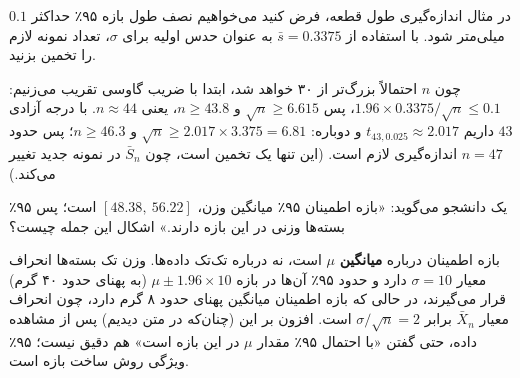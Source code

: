 \begin{exercise}
در مثال اندازه‌گیری طول قطعه، فرض کنید می‌خواهیم نصف طول بازه ۹۵٪ حداکثر $0.1$ میلی‌متر شود. با استفاده از $\bar s=0.3375$ به عنوان حدس اولیه برای $\sigma$، تعداد نمونه لازم را تخمین بزنید.
\end{exercise}
\begin{solution}
چون $n$ احتمالاً بزرگ‌تر از ۳۰ خواهد شد، ابتدا با ضریب گاوسی تقریب می‌زنیم: $1.96\times0.3375/\sqrt n\le0.1$، پس $\sqrt n\ge6.615$ و $n\ge43.8$، یعنی $n\approx44$. با درجه آزادی $43$ داریم $t_{43,0.025}\approx2.017$ و دوباره: $\sqrt n\ge2.017\times3.375=6.81$ و $n\ge46.3$؛ پس حدود $n=47$ اندازه‌گیری لازم است. (این تنها یک تخمین است، چون $\bar S_n$ در نمونه جدید تغییر می‌کند.)
\end{solution}

\begin{exercise}
یک دانشجو می‌گوید: «بازه اطمینان ۹۵٪ میانگین وزن، $[48.38,\ 56.22]$ است؛ پس ۹۵٪ بسته‌ها وزنی در این بازه دارند.» اشکال این جمله چیست؟
\end{exercise}
\begin{solution}
بازه اطمینان درباره \textbf{میانگین} $\mu$ است، نه درباره تک‌تک داده‌ها. وزن تک بسته‌ها انحراف معیار $\sigma=10$ دارد و حدود ۹۵٪ آن‌ها در بازه $\mu\pm1.96\times10$ (به پهنای حدود ۴۰ گرم) قرار می‌گیرند، در حالی که بازه اطمینان میانگین پهنای حدود ۸ گرم دارد، چون انحراف معیار $\bar X_n$ برابر $\sigma/\sqrt n=2$ است. افزون بر این (چنان‌که در متن دیدیم) پس از مشاهده داده، حتی گفتن «با احتمال ۹۵٪ مقدار $\mu$ در این بازه است» هم دقیق نیست؛ ۹۵٪ ویژگی روش ساخت بازه است.
\end{solution}
